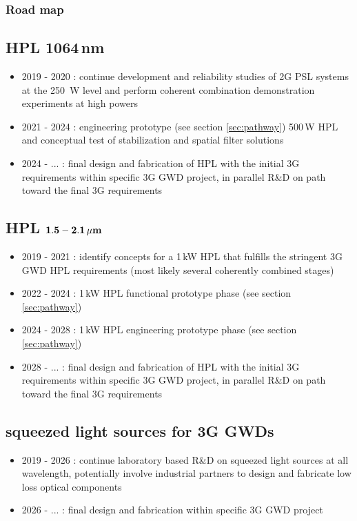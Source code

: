 \subsubsection{Road map}
\subsection*{HPL 1064\,nm}
\begin{itemize}
	\item 2019 - 2020 : continue development and reliability studies of 2G PSL systems at the 250\, W level and perform coherent combination demonstration experiments at high powers
	\item 2021 - 2024 : engineering prototype (see section \ref{sec:pathway}) 500\,W HPL and conceptual test of stabilization and spatial filter solutions
	\item 2024 - ... : final design and fabrication of HPL with the initial 3G requirements within specific 3G GWD project, in parallel R\&D on path toward the final 3G requirements 
\end{itemize} 


\subsection*{HPL ${\bf 1.5 - 2.1 \, {\bf \mu m}}$}
\begin{itemize}
	\item 2019 - 2021 : identify concepts for a 1\,kW HPL that fulfills the stringent 3G GWD HPL requirements (most likely several coherently combined stages)
	\item 2022 - 2024 : 1\,kW HPL functional prototype phase (see section \ref{sec:pathway})
	\item 2024 - 2028 : 1\,kW HPL engineering prototype phase (see section \ref{sec:pathway})
	\item 2028 - ... : final design and fabrication of HPL with the initial 3G requirements within specific 3G GWD project, in parallel R\&D on path toward the final 3G requirements
\end{itemize} 


\subsection*{squeezed light sources for 3G GWDs}
\begin{itemize}
	\item 2019 - 2026 : continue laboratory based R\&D on squeezed light sources at all wavelength, potentially involve industrial partners to design and fabricate low loss optical components
	\item 2026 - ... : final design and fabrication within specific 3G GWD project
\end{itemize}
